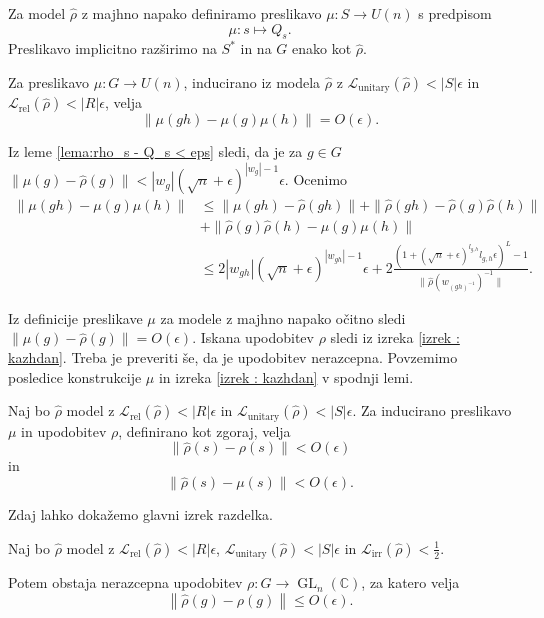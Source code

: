 \documentclass[mat2, tisk]{fmfdelo}
\newcommand{\Loss}[1]{\mathcal L _\text{#1}}
\newcommand{\C}{\mathbb C}
\begin{document}
Za model $\hat \rho$ z majhno napako definiramo
preslikavo $\mu \colon S \to U(n)$ s predpisom
$$
\mu \colon s \mapsto Q_s.
$$
Preslikavo implicitno razširimo
na $S^*$ in na $G$ enako kot $\hat \rho$.
\begin{lema}
  Za preslikavo $\mu \colon G \to U(n)$, inducirano iz
  modela $\hat \rho$ z $\Loss{unitary}(\hat \rho) < |S|\epsilon$
  in $\Loss{rel}(\hat \rho) < |R| \epsilon$,
  velja
  $$
  \|\mu(gh) - \mu(g)\mu(h)\| = O(\epsilon).
  $$
\end{lema}
\begin{dokaz}
  Iz leme \ref{lema:rho_s - Q_s < eps} sledi, da je za
  $g \in G$ $\|\mu(g)  - \hat \rho(g)\|<
  |w_g| (\sqrt{n} + \epsilon)^{|w_g| -1}  \epsilon$.
  Ocenimo
  \begin{align*}
    \|\mu(gh) - \mu(g)\mu(h)\|
    &\leq
    \|\mu(gh) - \hat \rho(gh)\|
    + \|\hat \rho(gh) - \hat \rho(g)\hat \rho(h)\| \\
    &+
    \|\hat \rho(g)\hat \rho(h) - \mu(g)\mu(h)\| \\
    &\leq
    2|w_{gh}| (\sqrt{n} + \epsilon)^{|w_{gh}| -1}  \epsilon
    +
    2 \frac{\left( 1 + (\sqrt{n} + \epsilon)^{l_{g,h}} l_{g,h} \epsilon
    \right)^L - 1}{\|\hat \rho(w_{(gh)^{-1}})^{-1} \|}.
  \end{align*}
\end{dokaz}
%
Iz definicije preslikave $\mu$ za modele z majhno napako očitno
sledi $\|\mu(g) - \hat \rho(g)\| = O(\epsilon)$.
Iskana upodobitev $\rho$ sledi iz izreka
\ref{izrek : kazhdan}. Treba je preveriti še, da je upodobitev
nerazcepna.
Povzemimo posledice  konstrukcije  $\mu$ in izreka \ref{izrek : kazhdan}
v spodnji lemi.
\begin{lema}
  Naj bo $\hat \rho$ model z
  $\Loss{rel}(\hat \rho) < |R| \epsilon$ in
  $\Loss{unitary}(\hat \rho) < |S| \epsilon$.
  Za inducirano preslikavo $\mu$ in upodobitev $\rho$,
  definirano kot zgoraj,
  velja
  $$
  \|\hat \rho(s) - \rho(s)\| < O(\epsilon)
  $$
  in
  $$
  \|\hat \rho(s) -\mu(s)\| < O(\epsilon).
  $$
\end{lema}
Zdaj lahko dokažemo glavni izrek razdelka.
\begin{izrek}
  Naj bo $\hat \rho$ model z
  $\Loss{rel}(\hat \rho) < |R| \epsilon$,
  $\Loss{unitary}(\hat \rho) < |S| \epsilon$
  in $\Loss{irr}(\hat \rho) < \frac{1}{2}$.

  Potem obstaja nerazcepna upodobitev $\rho \colon G \to
  \operatorname{GL}_n(\C) $, za katero velja
  $$
  \left\|
  \hat \rho(g) - \rho(g)
  \right\|
  \leq O(\epsilon).
  $$
\end{izrek}
\end{document}
